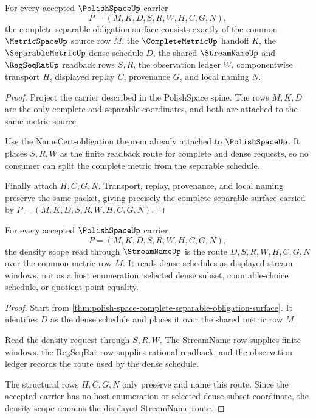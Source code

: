 \begin{theorem}
\label{thm:polish-space-complete-separable-obligation-surface}
For every accepted $\PolishSpaceUp$ carrier
$$
P=(M,K,D,S,R,W,H,C,G,N),
$$
the complete-separable obligation surface consists exactly of the common $\MetricSpaceUp$ source row $M$, the $\CompleteMetricUp$ handoff $K$, the $\SeparableMetricUp$ dense schedule $D$, the shared $\StreamNameUp$ and $\RegSeqRatUp$ readback rows $S,R$, the observation ledger $W$, componentwise transport $H$, displayed replay $C$, provenance $G$, and local naming $N$.
\end{theorem}
\begin{proof}
Project the carrier described in the PolishSpace spine. The rows $M,K,D$ are the only complete and separable coordinates, and both are attached to the same metric source.

Use the NameCert-obligation theorem already attached to $\PolishSpaceUp$. It places $S,R,W$ as the finite readback route for complete and dense requests, so no consumer can split the complete metric from the separable schedule.

Finally attach $H,C,G,N$. Transport, replay, provenance, and local naming preserve the same packet, giving precisely the complete-separable surface carried by $P=(M,K,D,S,R,W,H,C,G,N)$.
\end{proof}

\begin{theorem}
\label{thm:polish-space-streamname-density-scope}
For every accepted $\PolishSpaceUp$ carrier
$$
P=(M,K,D,S,R,W,H,C,G,N),
$$
the density scope read through $\StreamNameUp$ is the route $D,S,R,W,H,C,G,N$ over the common metric row $M$. It reads dense schedules as displayed stream windows, not as a host enumeration, selected dense subset, countable-choice schedule, or quotient point equality.
\end{theorem}
\begin{proof}
Start from \autoref{thm:polish-space-complete-separable-obligation-surface}. It identifies $D$ as the dense schedule and places it over the shared metric row $M$.

Read the density request through $S,R,W$. The StreamName row supplies finite windows, the RegSeqRat row supplies rational readback, and the observation ledger records the route used by the dense schedule.

The structural rows $H,C,G,N$ only preserve and name this route. Since the accepted carrier has no host enumeration or selected dense-subset coordinate, the density scope remains the displayed StreamName route.
\end{proof}

